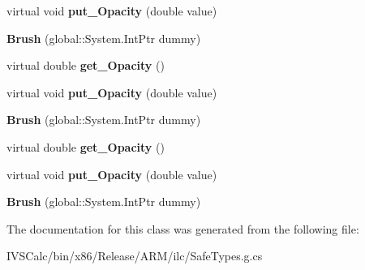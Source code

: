 \begin{DoxyCompactItemize}
virtual void {\bfseries put\+\_\+\+Opacity} (double value)
\item 
\mbox{\label{class_windows_1_1_u_i_1_1_xaml_1_1_media_1_1_brush_a99b1462ccb0e9be0649abc38da7d89ef}} 
{\bfseries Brush} (global\+::\+System.\+Int\+Ptr dummy)
\item 
\mbox{\label{class_windows_1_1_u_i_1_1_xaml_1_1_media_1_1_brush_aaa03ea854aaf4abc371f5fa73edf783c}} 
virtual double {\bfseries get\+\_\+\+Opacity} ()
\item 
\mbox{\label{class_windows_1_1_u_i_1_1_xaml_1_1_media_1_1_brush_a570dcbca433c3f0cd5838d9c8045cc6d}} 
virtual void {\bfseries put\+\_\+\+Opacity} (double value)
\item 
\mbox{\label{class_windows_1_1_u_i_1_1_xaml_1_1_media_1_1_brush_a99b1462ccb0e9be0649abc38da7d89ef}} 
{\bfseries Brush} (global\+::\+System.\+Int\+Ptr dummy)
\item 
\mbox{\label{class_windows_1_1_u_i_1_1_xaml_1_1_media_1_1_brush_aaa03ea854aaf4abc371f5fa73edf783c}} 
virtual double {\bfseries get\+\_\+\+Opacity} ()
\item 
\mbox{\label{class_windows_1_1_u_i_1_1_xaml_1_1_media_1_1_brush_a570dcbca433c3f0cd5838d9c8045cc6d}} 
virtual void {\bfseries put\+\_\+\+Opacity} (double value)
\item 
\mbox{\label{class_windows_1_1_u_i_1_1_xaml_1_1_media_1_1_brush_a99b1462ccb0e9be0649abc38da7d89ef}} 
{\bfseries Brush} (global\+::\+System.\+Int\+Ptr dummy)
\end{DoxyCompactItemize}


The documentation for this class was generated from the following file\+:\begin{DoxyCompactItemize}
\item 
I\+V\+S\+Calc/bin/x86/\+Release/\+A\+R\+M/ilc/Safe\+Types.\+g.\+cs\end{DoxyCompactItemize}
